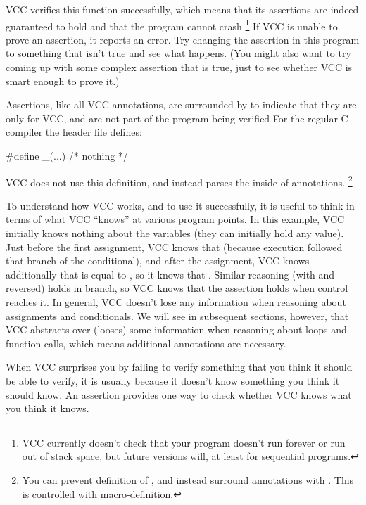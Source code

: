 VCC verifies this function successfully, which means that its
assertions are indeed guaranteed to hold and that the program cannot
crash%
\footnote{
  VCC currently doesn't check that your program doesn't run forever or
  run out of stack space, but future versions will, at least for sequential
  programs.  
}
If VCC is unable
to prove an assertion, it reports an error.  Try changing the
assertion in this program to something that isn't true and see what
happens. (You might also want to try coming up with some complex
assertion that is true, just to see whether VCC is smart enough to
prove it.)

Assertions, like all VCC annotations, 
are surrounded by  to indicate that they are
only for VCC, and are not part of the program being verified
For the regular C compiler the  header file defines:
\begin{VCC}
#define _(...) /* nothing */
\end{VCC}
VCC does not use this definition, and instead parses the inside of 
annotations.%
\footnote{
  You can prevent definition of \vcc{_}, and instead surround annotations with
  .
  This is controlled with  macro-definition.
   }

To understand how VCC works, and to use it successfully, it is useful to
think in terms of what VCC ``knows'' at various program points. In
this example, VCC initially knows nothing about the variables (they
can initially hold any value). 
Just before the first assignment, VCC knows that 
 (because execution followed that branch of the conditional), and
after the assignment, VCC knows additionally that  is equal to
, so it knows that . Similar reasoning
(with  and  reversed) holds in  branch, so VCC
knows that the assertion holds when control reaches it. In general,
VCC doesn't lose any information when reasoning about assignments and
conditionals. We will see in subsequent sections, however, that VCC
abstracts over (looses) some information when reasoning about loops and function calls,
which means additional annotations are necessary.

When VCC surprises you by failing to verify something that you think
it should be able to verify, it is usually because it doesn't know
something you think it should know. An assertion provides one way to
check whether VCC knows what you think it knows.

